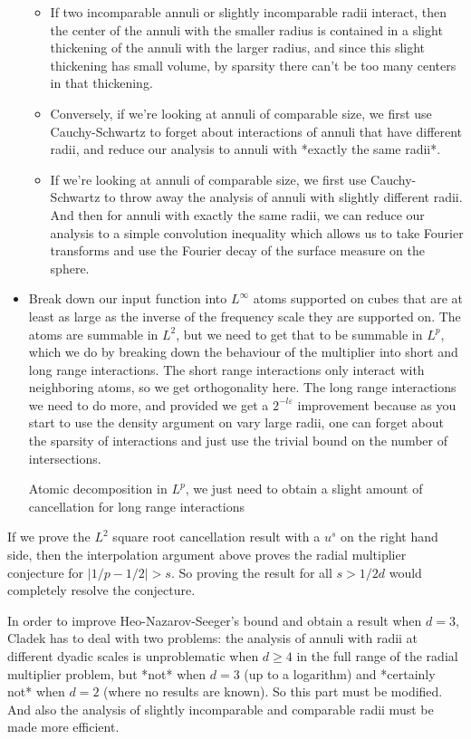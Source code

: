 \documentclass[11pt]{article}
\begin{document}
\begin{itemize}
    \begin{itemize}
        \item If two incomparable annuli or slightly incomparable radii interact, then the center of the annuli with the smaller radius is contained in a slight thickening of the annuli with the larger radius, and since this slight thickening has small volume, by sparsity there can't be too many centers in that thickening.

        \item Conversely, if we're looking at annuli of comparable size, we first use Cauchy-Schwartz to forget about interactions of annuli that have different radii, and reduce our analysis to annuli with *exactly the same radii*.

        \item If we're looking at annuli of comparable size, we first use Cauchy-Schwartz to throw away the analysis of annuli with slightly different radii. And then for annuli with exactly the same radii, we can reduce our analysis to a simple convolution inequality which allows us to take Fourier transforms and use the Fourier decay of the surface measure on the sphere.
    \end{itemize}
    \item Break down our input function into $L^\infty$ atoms supported on cubes that are at least as large as the inverse of the frequency scale they are supported on. The atoms are summable in $L^2$, but we need to get that to be summable in $L^p$, which we do by breaking down the behaviour of the multiplier into short and long range interactions. The short range interactions only interact with neighboring atoms, so we get orthogonality here. The long range interactions we need to do more, and provided we get a $2^{-l\varepsilon}$ improvement because as you start to use the density argument on vary large radii, one can forget about the sparsity of interactions and just use the trivial bound on the number of intersections.

     Atomic decomposition in $L^p$, we just need to obtain a slight amount of cancellation for long range interactions 
\end{itemize}
%
If we prove the $L^2$ square root cancellation result with a $u^s$ on the right hand side, then the interpolation argument above proves the radial multiplier conjecture for $|1/p - 1/2| > s$. So proving the result for all $s > 1/2d$ would completely resolve the conjecture.

In order to improve Heo-Nazarov-Seeger's bound and obtain a result when $d = 3$, Cladek has to deal with two problems: the analysis of annuli with radii at different dyadic scales is unproblematic when $d \geq 4$ in the full range of the radial multiplier problem, but *not* when $d = 3$ (up to a logarithm) and *certainly not* when $d = 2$ (where no results are known). So this part must be modified. And also the analysis of slightly incomparable and comparable radii must be made more efficient.
\end{document}
